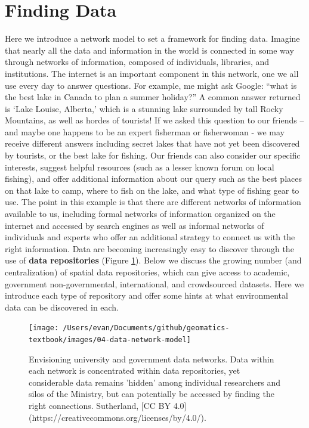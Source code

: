\documentclass[
]{book}
\begin{document}
\hypertarget{finding-data}{%
\section{Finding Data}\label{finding-data}}

Here we introduce a network model to set a framework for finding data. Imagine that nearly all the data and information in the world is connected in some way through networks of information, composed of individuals, libraries, and institutions. The internet is an important component in this network, one we all use every day to answer questions. For example, me might ask Google: ``what is the best lake in Canada to plan a summer holiday?'' A common answer returned is `Lake Louise, Alberta,' which is a stunning lake surrounded by tall Rocky Mountains, as well as hordes of tourists! If we asked this question to our friends -- and maybe one happens to be an expert fisherman or fisherwoman - we may receive different answers including secret lakes that have not yet been discovered by tourists, or the best lake for fishing. Our friends can also consider our specific interests, suggest helpful resources (such as a lesser known forum on local fishing), and offer additional information about our query such as the best places on that lake to camp, where to fish on the lake, and what type of fishing gear to use. The point in this example is that there are different networks of information available to us, including formal networks of information organized on the internet and accessed by search engines as well as informal networks of individuals and experts who offer an additional strategy to connect us with the right information.
Data are becoming increasingly easy to discover through the use of \textbf{data repositories} (Figure \ref{fig:04-data-network-model}). Below we discuss the growing number (and centralization) of spatial data repositories, which can give access to academic, government non-governmental, international, and crowdsourced datasets. Here we introduce each type of repository and offer some hints at what environmental data can be discovered in each.

\begin{figure}
\texttt{[image: /Users/evan/Documents/github/geomatics-textbook/images/04-data-network-model]} \caption{Envisioning university and government data networks. Data within each network is concentrated within data repositories, yet considerable data remains 'hidden' among individual researchers and silos of the Ministry, but can potentially be accessed by finding the right connections. Sutherland, [CC BY 4.0](https://creativecommons.org/licenses/by/4.0/).}\label{fig:04-data-network-model}
\end{figure}
\end{document}
